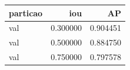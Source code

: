 \begin{tabular}{lrr}
\toprule
particao & iou & AP \\
\midrule
val & 0.300000 & 0.904451 \\
val & 0.500000 & 0.884750 \\
val & 0.750000 & 0.797578 \\
\bottomrule
\end{tabular}
